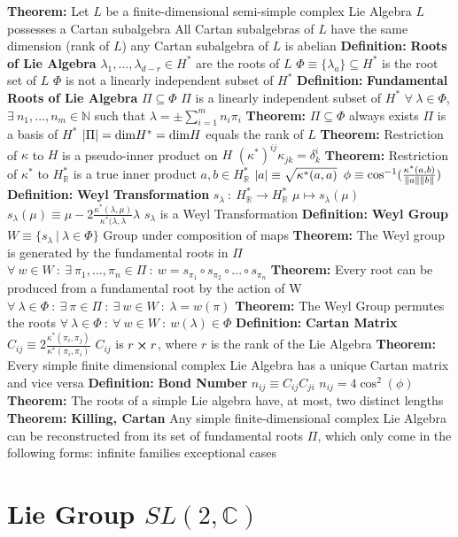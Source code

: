 \documentclass[14pt]{extarticle}
\def\Definition{{\color{blue} \textbf{Definition:} }}
\def\Theorem{{\color{red} \textbf{Theorem:} }}
\begin{document}
\begin{outline}
		\1	\Theorem Let $L$ be a finite-dimensional semi-simple complex Lie Algebra
			\2	$L$ possesses a Cartan subalgebra
			\2	All Cartan subalgebras of $L$ have the same dimension (rank of $L$)
			\2	any Cartan subalgebra of $L$ is abelian
		\1	\Definition \textbf{Roots of Lie Algebra}
			\2	$\lambda_1,...,\lambda_{d-r} \in H^*$ are the roots of $L$
			\2	$\Phi \equiv \{\lambda_a\} \subseteq H^*$ is the root set of $L$
			\2	$\Phi$ is not a linearly independent subset of $H^*$
		\1	\Definition \textbf{Fundamental Roots of Lie Algebra}
			\2	$\Pi \subseteq \Phi$
			\2	$\Pi$ is a linearly independent subset of $H^*$
			\2	$\forall~\lambda \in \Phi$, $\exists~n_1,...,n_m \in \mathbb{N}$ such that
					$\lambda = \pm \sum_{i=1}^m n_i \pi_i$
			\2	\Theorem
				\3	$\Pi \subseteq \Phi$ always exists
				\3	$\Pi$ is a basis of $H^*$
				\3	$\abs{\Pi} = \text{dim}H^* = \text{dim}H$ equals the rank of $L$
		\1	\Theorem Restriction of $\kappa$ to $H$ is a pseudo-inner product on $H$
			\2	$(\kappa^*)^{ij}\kappa_{jk} = \delta^i_k$
		\1	\Theorem Restriction of $\kappa^*$ to $H^*_{\mathbb{R}}$ is a true inner product
			\2	$a,b \in H^*_{\mathbb{R}}$
			\2	$\abs{a} \equiv \sqrt{\kappa^*(a,a)}$
			\2	$\phi \equiv \cos^{-1}(\frac{\kappa^*(a,b)}{\norm{a}\norm{b}})$
		\1	\Definition \textbf{Weyl Transformation}
			\2	$s_{\lambda}~:~H^*_{\mathbb{R}} \rightarrow H^*_{\mathbb{R}}$
			\2	$\mu \mapsto s_{\lambda}(\mu)$
			\2	$s_{\lambda}(\mu) \equiv \mu - 2 \frac{\kappa^*(\lambda,\mu)}{\kappa^*(\lambda,\lambda}\lambda$
			\2	$s_{\lambda}$ is a Weyl Transformation
			\2	\Definition \textbf{Weyl Group}
				\3	$W \equiv \{s_{\lambda}~|~\lambda \in \Phi\}$
				\3	Group under composition of maps
				\3	\Theorem The Weyl group is generated by the fundamental roots in $\Pi$
					\4	$\forall~w \in W~:~\exists~\pi_1,...,\pi_n \in \Pi~:~
								w = s_{\pi_1} \circ s_{\pi_2} \circ ... \circ s_{\pi_n}$
				\3	\Theorem Every root can be produced from a fundamental root by the
						action of W
					\4	$\forall~\lambda \in \Phi~:~\exists~\pi \in \Pi~:~\exists~w \in W~:~ \lambda = w(\pi)$
				\3	\Theorem The Weyl Group permutes the roots
					\4	$\forall~\lambda \in \Phi~:~\forall~w \in W~:~w(\lambda) \in \Phi$
		\1	\Definition \textbf{Cartan Matrix}
			\2	$C_{ij} \equiv 2 \frac{\kappa^*(\pi_i,\pi_j)}{\kappa^*(\pi_i,\pi_i)}$
			\2	$C_{ij}$ is $r \cross r$, where $r$ is the rank of the Lie Algebra
			\2	\Theorem Every simple finite dimensional complex Lie Algebra has a 
					unique Cartan matrix and vice versa
		\1	\Definition \textbf{Bond Number}
			\2	$n_{ij} \equiv C_{ij}C_{ji}$
			\2	$n_{ij} = 4 \cos^2(\phi)$
		\1	\Theorem The roots of a simple Lie algebra have, at most, two distinct
				lengths
		\1	\Theorem \textbf{Killing, Cartan}
			\2	Any simple finite-dimensional complex Lie Algebra can be reconstructed
					from its set of fundamental roots $\Pi$, which only come in the following
					forms:
				 infinite families
				 exceptional cases
	
	\section*{Lie Group $SL(2,\mathbb{C})$}
	\end{outline}
\end{document}
